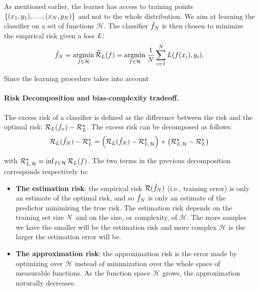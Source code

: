 As mentioned earlier, the learner has access to training points  $\{(x_1,y_1),\dots,(x_N,y_N)\}$ and not to the whole distribution. We aim at learning the classifier on a set of functions $\mathcal{H}$. The classifier $\hat{f}_N $ is then chosen to minimize the empirical risk given a loss $L$:
\begin{align*}
    \hat{f}_N = \operatorname*{argmin}_{f\in\mathcal{H}}\widehat{\mathcal{R}}_{L}(f)= \operatorname*{argmin}_{f\in\mathcal{H}}\frac{1}{N}\sum_{i=1}^N L(f(x_i),y_i).
\end{align*}

Since the learning procedure takes into account 


\paragraph*{Risk Decomposition and bias-complexity tradeoff.} The excess risk of a classifier is defined as the difference between the risk and the optimal risk: $\mathcal{R}_L(f_n) - \mathcal{R}_L^\star$. The excess risk can be decomposed as follows:
\begin{align*}
    \risk_\loss( \hat{f}_\numsamples) - \risk_\loss^\star = \left(\risk_\loss( \hat{f}_\numsamples) - \risk_{\loss,\mathcal{H}}^\star\right)+ \left(\risk_{\loss,\mathcal{H}}^\star - \risk_\loss^\star\right)
\end{align*}

with $\mathcal{R}_{L,\mathcal{H}}^\star = \inf_{f\in\mathcal{H}}\mathcal{R}_L(f)$. The two terms in the previous decomposition corresponds respectively to:
\begin{itemize}
    \item \textbf{The estimation risk}:  the empirical risk $\mathcal{R}(\hat{f}_N)$ (i.e., training error) is only an estimate of the optimal risk, and so $\hat{f}_N$   is only an estimate of the predictor minimizing the true risk. The estimation risk depends on the training set size $N$ and on the size, or complexity, of  $\mathcal{H}$.  The more samples we have the smaller will be the estimation risk and more complex $\mathcal{H}$ is the larger the estimation error will be.
    \item \textbf{The approximation risk}: the approximation risk is the error made by optimizing over $\mathcal{H}$ instead of minimization over the whole space of measurable functions. As  the function space $\mathcal{H}$ grows, the approximation naturally decreases. 
\end{itemize}

